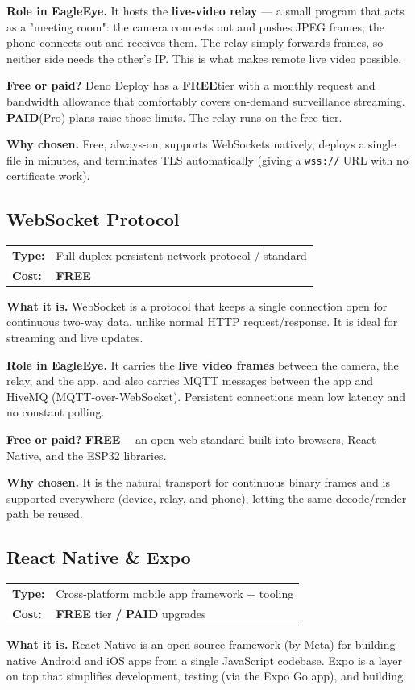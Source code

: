 \documentclass[11pt,a4paper]{article}
\makeatletter
\newcommand{\code}[1]{\texttt{#1}}
\newcommand{\free}{\textbf{\color{freegreen}FREE}}
\newcommand{\paid}{\textbf{\color{paidorange}PAID}}
\newcommand{\freepaid}{\textbf{\color{freegreen}FREE} tier \textbf{/} \textbf{\color{paidorange}PAID} upgrades}
\newcommand{\techhead}[2]{\par\vspace{0.3em}\noindent
  \begin{tabularx}{\linewidth}{@{}lX@{}}
  \textbf{Type:} & #1 \\
  \textbf{Cost:} & #2 \\
  \end{tabularx}\par\vspace{0.3em}}
\makeatother
\begin{document}
\textbf{Role in EagleEye.} It hosts the \textbf{live-video relay} --- a small program that acts
as a "meeting room": the camera connects out and pushes JPEG frames; the phone connects out and
receives them. The relay simply forwards frames, so neither side needs the other's IP. This is
what makes remote live video possible.

\textbf{Free or paid?} Deno Deploy has a \free tier with a monthly request and bandwidth
allowance that comfortably covers on-demand surveillance streaming. \paid (Pro) plans raise
those limits. The relay runs on the free tier.

\textbf{Why chosen.} Free, always-on, supports WebSockets natively, deploys a single file in
minutes, and terminates TLS automatically (giving a \code{wss://} URL with no certificate work).

\subsection{WebSocket Protocol}
\techhead{Full-duplex persistent network protocol / standard}{\free}
\textbf{What it is.} WebSocket is a protocol that keeps a single connection open for continuous
two-way data, unlike normal HTTP request/response. It is ideal for streaming and live updates.

\textbf{Role in EagleEye.} It carries the \textbf{live video frames} between the camera, the
relay, and the app, and also carries MQTT messages between the app and HiveMQ
(MQTT-over-WebSocket). Persistent connections mean low latency and no constant polling.

\textbf{Free or paid?} \free --- an open web standard built into browsers, React Native, and
the ESP32 libraries.

\textbf{Why chosen.} It is the natural transport for continuous binary frames and is supported
everywhere (device, relay, and phone), letting the same decode/render path be reused.

\subsection{React Native \& Expo}
\techhead{Cross-platform mobile app framework + tooling}{\freepaid}
\textbf{What it is.} React Native is an open-source framework (by Meta) for building native
Android and iOS apps from a single JavaScript codebase. Expo is a layer on top that simplifies
development, testing (via the Expo Go app), and building.
\end{document}
